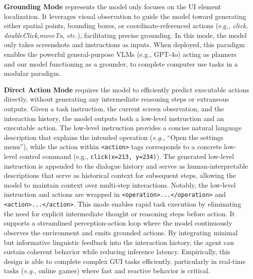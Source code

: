 \documentclass{article} %
\def\eg{\emph{e.g.}}
\def\etc{\emph{etc.}}
\begin{document}
\textbf{Grounding Mode} represents the model only focuses on the UI element localization. 
% 
It leverages visual observation to guide the model toward generating either spatial points, bounding boxes, or coordinate-referenced actions (e.g., \textit{click}, \textit{doubleClick},\textit{moveTo}, \etc), facilitating precise grounding. In this mode, the model only takes screenshots and instructions as inputs. 
% 
When deployed, this paradigm enables the powerful general-purpose VLMs (e.g., GPT-4o) acting as planners and our model functioning as a grounder, to complete computer use tasks in a modular paradigm. 

\textbf{Direct Action Mode} requires the model to efficiently predict executable actions directly, without generating any intermediate reasoning steps or extraneous outputs. Given a task instruction, the current screen observation, and the interaction history, the model outputs both a low-level instruction and an executable action. The low-level instruction provides a concise natural language description that explains the intended operation (\eg, “Open the settings menu”), while the action within \texttt{<action>} tags corresponds to a concrete low-level control command (e.g., \texttt{click(x=213, y=234)}). The generated low-level instruction is appended to the dialogue history and serves as human-interpretable descriptions that serve as historical context for subsequent steps, allowing the model to maintain context over multi-step interactions. Notably, the low-level instruction and actions are wrapped in \texttt{<operation>...</operation>} and \texttt{<action>...</action>}.
This mode enables rapid task execution by eliminating the need for explicit intermediate thought or reasoning steps before action. It supports a streamlined perception-action loop where the model continuously observes the environment and emits grounded actions. By integrating minimal but informative linguistic feedback into the interaction history, the agent can sustain coherent behavior while reducing inference latency. Empirically, this design is able to complete complex GUI tasks efficiently, particularly in real-time tasks (\eg, online games) where fast and reactive behavior is critical. 
\end{document}
